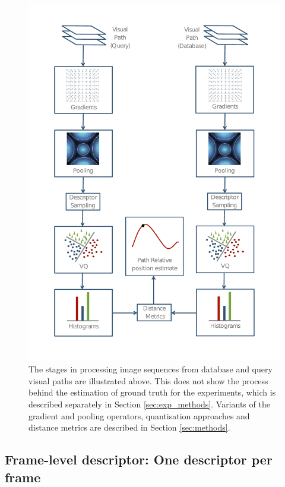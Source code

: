 \begin{figure}
\begin{center}
\includegraphics[width=\textwidth]{./gfx/Chapter04/pipeline.pdf}
\caption{The stages in processing image sequences from database and query visual paths are illustrated above.  This does not show the process behind the estimation of ground truth for the experiments, which is described separately in Section \ref{sec:exp_methods}.  Variants of the gradient and pooling operators, quantisation approaches and distance metrics are described in Section \ref{sec:methods}.}
\label{fig:FigPipeline}
\end{center}
\end{figure}

\subsection{Frame-level descriptor: One descriptor per frame}


